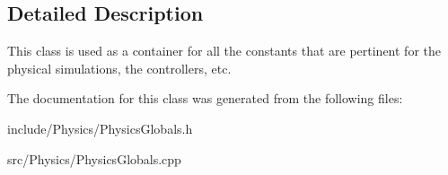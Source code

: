\subsection{Detailed Description}
This class is used as a container for all the constants that are pertinent for the physical simulations, the controllers, etc. 

The documentation for this class was generated from the following files:\begin{DoxyCompactItemize}
\item 
include/Physics/PhysicsGlobals.h\item 
src/Physics/PhysicsGlobals.cpp\end{DoxyCompactItemize}
